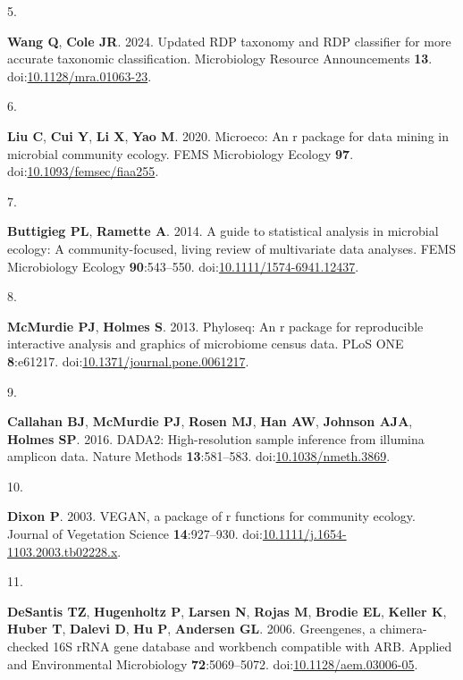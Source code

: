 \documentclass[
  11pt,
]{article}
\newlength{\cslhangindent}
\newlength{\csllabelwidth}
\newenvironment{CSLReferences}[2] %
 {\begin{list}{}{%
  \setlength{\itemindent}{0pt}
  \setlength{\leftmargin}{0pt}
  \setlength{\parsep}{0pt}
  \ifodd #1
   \setlength{\leftmargin}{\cslhangindent}
   \setlength{\itemindent}{-1\cslhangindent}
  \fi
  \setlength{\itemsep}{#2\baselineskip}}}
 {\end{list}}
\newcommand{\CSLLeftMargin}[1]{\parbox[t]{\csllabelwidth}{\strut#1\strut}}
\newcommand{\CSLRightInline}[1]{\parbox[t]{\linewidth - \csllabelwidth}{\strut#1\strut}}
\begin{document}
\begin{CSLReferences}{0}{1}
\CSLLeftMargin{5. }%
\CSLRightInline{\textbf{Wang Q}, \textbf{Cole JR}. 2024. Updated RDP
taxonomy and RDP classifier for more accurate taxonomic classification.
Microbiology Resource Announcements \textbf{13}.
doi:\href{https://doi.org/10.1128/mra.01063-23}{10.1128/mra.01063-23}.}

\CSLLeftMargin{6. }%
\CSLRightInline{\textbf{Liu C}, \textbf{Cui Y}, \textbf{Li X},
\textbf{Yao M}. 2020. Microeco: An r package for data mining in
microbial community ecology. FEMS Microbiology Ecology \textbf{97}.
doi:\href{https://doi.org/10.1093/femsec/fiaa255}{10.1093/femsec/fiaa255}.}

\CSLLeftMargin{7. }%
\CSLRightInline{\textbf{Buttigieg PL}, \textbf{Ramette A}. 2014. A guide
to statistical analysis in microbial ecology: A community-focused,
living review of multivariate data analyses. FEMS Microbiology Ecology
\textbf{90}:543--550.
doi:\href{https://doi.org/10.1111/1574-6941.12437}{10.1111/1574-6941.12437}.}

\CSLLeftMargin{8. }%
\CSLRightInline{\textbf{McMurdie PJ}, \textbf{Holmes S}. 2013. Phyloseq:
An r package for reproducible interactive analysis and graphics of
microbiome census data. PLoS ONE \textbf{8}:e61217.
doi:\href{https://doi.org/10.1371/journal.pone.0061217}{10.1371/journal.pone.0061217}.}

\CSLLeftMargin{9. }%
\CSLRightInline{\textbf{Callahan BJ}, \textbf{McMurdie PJ},
\textbf{Rosen MJ}, \textbf{Han AW}, \textbf{Johnson AJA}, \textbf{Holmes
SP}. 2016. DADA2: High-resolution sample inference from illumina
amplicon data. Nature Methods \textbf{13}:581--583.
doi:\href{https://doi.org/10.1038/nmeth.3869}{10.1038/nmeth.3869}.}

\CSLLeftMargin{10. }%
\CSLRightInline{\textbf{Dixon P}. 2003. {VEGAN}, a package of r
functions for community ecology. Journal of Vegetation Science
\textbf{14}:927--930.
doi:\href{https://doi.org/10.1111/j.1654-1103.2003.tb02228.x}{10.1111/j.1654-1103.2003.tb02228.x}.}

\CSLLeftMargin{11. }%
\CSLRightInline{\textbf{DeSantis TZ}, \textbf{Hugenholtz P},
\textbf{Larsen N}, \textbf{Rojas M}, \textbf{Brodie EL}, \textbf{Keller
K}, \textbf{Huber T}, \textbf{Dalevi D}, \textbf{Hu P}, \textbf{Andersen
GL}. 2006. Greengenes, a chimera-checked 16S rRNA gene database and
workbench compatible with ARB. Applied and Environmental Microbiology
\textbf{72}:5069--5072.
doi:\href{https://doi.org/10.1128/aem.03006-05}{10.1128/aem.03006-05}.}


\end{CSLReferences}
\end{document}
